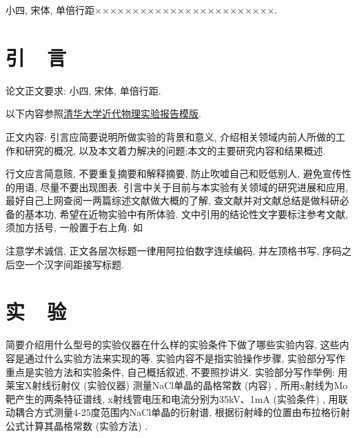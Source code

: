 \documentclass{urtemp}
\begin{document}


\begin{@twocolumnfalse}
\maketitle

\begin{empAbstract}
小四, 宋体, 单倍行距××××××××××××××××××××××××.
\end{empAbstract}

\end{@twocolumnfalse}

\xiaosihao 

\section{引~~言}

论文正文要求: 小四, 宋体, 单倍行距.

以下内容参照\href{https://www.overleaf.com/latex/templates/thu-emp-qing-hua-da-xue-jin-dai-wu-li-shi-yan-bao-gao-mo-ban/mbgqcryqhwqd}{清华大学近代物理实验报告模版}.

正文内容: 引言应简要说明所做实验的背景和意义, 介绍相关领域内前人所做的工作和研究的概况, 以及本文着力解决的问题;本文的主要研究内容和结果概述. 

行文应言简意赅, 不要重复摘要和解释摘要, 防止吹嘘自己和贬低别人, 避免宣传性的用语, 尽量不要出现图表. 引言中关于目前与本实验有关领域的研究进展和应用, 最好自己上网查阅一两篇综述文献做大概的了解, 查文献并对文献总结是做科研必备的基本功, 希望在近物实验中有所体验. 文中引用的结论性文字要标注参考文献, 须加方括号, 一般置于右上角. 如\cite{王合英2008磁控溅射镀膜过程中非均匀磁场中电子的运动, 王合英2018自主探究实验对学生综合素质和创新能力的培养}

注意学术诚信, 正文各层次标题一律用阿拉伯数字连续编码, 并左顶格书写, 序码之后空一个汉字间距接写标题. 


\section{实~~验}

简要介绍用什么型号的实验仪器在什么样的实验条件下做了哪些实验内容, 这些内容是通过什么实验方法来实现的等. 
实验内容不是指实验操作步骤, 实验部分写作重点是实验方法和实验条件, 自己概括叙述, 不要照抄讲义. 
实验部分写作举例: 用莱宝X射线衍射仪 (实验仪器) 测量NaCl单晶的晶格常数 (内容) , 所用x射线为Mo靶产生的两条特征谱线, x射线管电压和电流分别为35kV、1mA (实验条件) , 用联动耦合方式测量4-25度范围内NaCl单晶的衍射谱, 根据衍射峰的位置由布拉格衍射公式计算其晶格常数 (实验方法) . 
\end{document}
